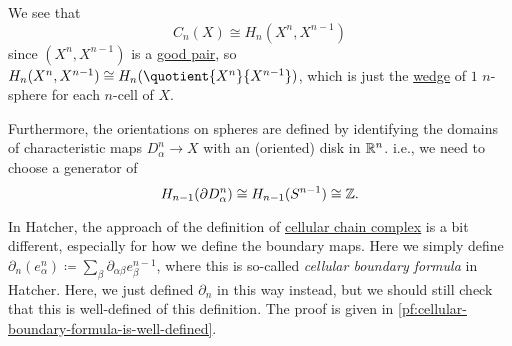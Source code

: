 \begin{remark}
	We see that
	\[
		C_{n} (X) \cong H_{n} (X^n, X^{n-1})
	\]
	since \((X^n, X^{n-1})\) is a \hyperref[def:good-pair]{good pair}, so \(H_{n} (X^n, X^{n-1}) \cong H_n(\quotient{X^n}{X^{n-1}})\), which is
	just the \hyperref[CW-complex-wedge-sum]{wedge} of \(1\) \(n\)-sphere for each \(n\)-cell of \(X\).

	Furthermore, the orientations on spheres are defined by identifying the domains of characteristic maps 	\(D^n_\alpha \to X\) with an (oriented) disk in
	\(\mathbb{\MakeUppercase{r}} ^n\). i.e., we need to choose a generator of
	\[
		H_{n-1}(\partial D^n_\alpha) \cong H_{n-1}(S^{n-1})\cong \mathbb{\MakeUppercase{z}}.
	\]
\end{remark}
\begin{note}
	In Hatcher\cite{hatcher2002algebraic}, the approach of the definition of \hyperref[def:cellular-chain-complex]{cellular chain complex} is
	a bit different, especially for how we define the boundary maps. Here we simply define \(\partial _n(e^n_\alpha ) \coloneqq \sum_\beta \partial _{\alpha \beta }e^{n-1}_\beta\),
	where this is so-called \emph{cellular boundary formula} in Hatcher\cite{hatcher2002algebraic}. Here, we just defined \(\partial _n\) in this way instead, but
	we should still check that this is well-defined of this definition. The proof is given in \autoref{pf:cellular-boundary-formula-is-well-defined}.
\end{note}

